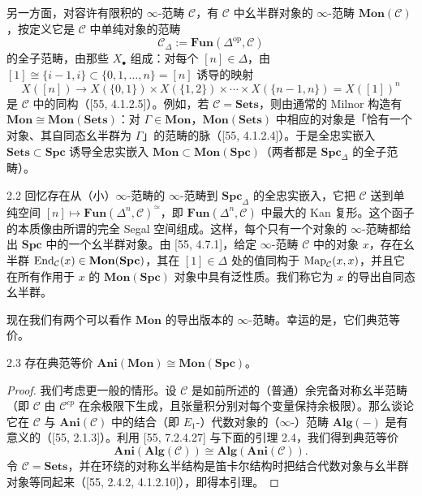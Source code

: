 另一方面，对容许有限积的 $\infty$-范畴 $\mathcal C$，有 $\mathcal C$ 中幺半群对象的 $\infty$-范畴 $\mathbf{Mon}(\mathcal C)$，按定义它是 $\mathcal C$ 中单纯对象的范畴
\[
\mathcal C_\Delta:=\mathbf{Fun}(\Delta^{\mathrm{op}},\mathcal C)
\]
的全子范畴，由那些 $X_\bullet$ 组成：对每个 $[n]\in\Delta$，由 $[1]\cong\{i-1,i\}\subset\{0,1,\dots,n\}=[n]$ 诱导的映射
\[
X([n])\to X(\{0,1\})\times X(\{1,2\})\times\cdots\times X(\{n-1,n\})=X([1])^n
\]
是 $\mathcal C$ 中的同构（[55, 4.1.2.5]）。例如，若 $\mathcal C=\mathbf{Sets}$，则由通常的 Milnor 构造有 $\mathbf{Mon}\cong\mathbf{Mon}(\mathbf{Sets})$：对 $\Gamma\in\mathbf{Mon}$，$\mathbf{Mon}(\mathbf{Sets})$ 中相应的对象是「恰有一个对象、其自同态幺半群为 $\Gamma$」的范畴的脉（[55, 4.1.2.4]）。于是全忠实嵌入 $\mathbf{Sets}\subset\mathbf{Spc}$ 诱导全忠实嵌入 $\mathbf{Mon}\subset\mathbf{Mon}(\mathbf{Spc})$（两者都是 $\mathbf{Spc}_\Delta$ 的全子范畴）。

\begin{exam}{2.2}\label{exam:a2-2-2}
回忆存在从（小）$\infty$-范畴的 $\infty$-范畴到 $\mathbf{Spc}_\Delta$ 的全忠实嵌入，它把 $\mathcal C$ 送到单纯空间 $[n]\mapsto\mathbf{Fun}(\Delta^n,\mathcal C)^{\simeq}$，即 $\mathbf{Fun}(\Delta^n,\mathcal C)$ 中最大的 Kan 复形。这个函子的本质像由所谓的完全 Segal 空间组成。这样，每个只有一个对象的 $\infty$-范畴都给出 $\mathbf{Spc}$ 中的一个幺半群对象。由 [55, 4.7.1]，给定 $\infty$-范畴 $\mathcal C$ 中的对象 $x$，存在幺半群 $\operatorname{End}_{\mathcal C}(x)\in\mathbf{Mon}(\mathbf{Spc})$，其在 $[1]\in\Delta$ 处的值同构于 $\operatorname{Map}_{\mathcal C}(x,x)$，并且它在所有作用于 $x$ 的 $\mathbf{Mon}(\mathbf{Spc})$ 对象中具有泛性质。我们称它为 $x$ 的导出自同态幺半群。
\end{exam}

现在我们有两个可以看作 $\mathbf{Mon}$ 的导出版本的 $\infty$-范畴。幸运的是，它们典范等价。

\begin{lem}{2.3}\label{lem:a2-2-3}
存在典范等价 $\mathbf{Ani}(\mathbf{Mon})\cong\mathbf{Mon}(\mathbf{Spc})$。
\end{lem}

\begin{proof}
我们考虑更一般的情形。设 $\mathcal C$ 是如前所述的（普通）余完备对称幺半范畴（即 $\mathcal C$ 由 $\mathcal C^{cp}$ 在余极限下生成，且张量积分别对每个变量保持余极限）。那么谈论它在 $\mathcal C$ 与 $\mathbf{Ani}(\mathcal C)$ 中的结合（即 $E_1$-）代数对象的（$\infty$-）范畴 $\mathbf{Alg}(-)$ 是有意义的（[55, 2.1.3]）。利用 [55, 7.2.4.27] 与下面的引理 2.4，我们得到典范等价
\[
\mathbf{Ani}(\mathbf{Alg}(\mathcal C))\cong\mathbf{Alg}(\mathbf{Ani}(\mathcal C)).
\]
令 $\mathcal C=\mathbf{Sets}$，并在环绕的对称幺半结构是笛卡尔结构时把结合代数对象与幺半群对象等同起来（[55, 2.4.2, 4.1.2.10]），即得本引理。
\end{proof}

